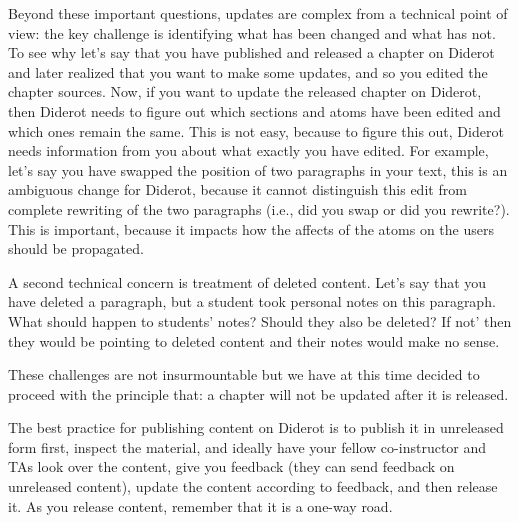 Beyond these important questions, updates are complex from a technical
point of view: the key challenge is identifying what has been changed
and what has not.
%
To see why let's say that you have published and released a chapter on Diderot and later realized that you want to make some updates, and so you edited the chapter sources.
%
Now, if you want to update the released chapter on Diderot, then
Diderot needs to figure out which sections and atoms have been edited
and which ones remain the same.  This is not easy, because to figure
this out, Diderot needs information from you about what exactly you
have edited.  For example, let's say you have swapped the position of
two paragraphs in your text, this is an ambiguous change for Diderot,
because it cannot distinguish this edit from complete rewriting of the
two paragraphs (i.e., did you swap or did you rewrite?). 
%
This is important, because it impacts how the affects of the atoms on the users should be propagated.  

%
A second technical concern is treatment of deleted content.  Let's say that you have deleted a paragraph, but a student took personal notes on this paragraph.  What should happen to students' notes?  Should they also be deleted? If not' then they would be pointing to deleted content and their notes would make no sense.  

\begin{gram}
These challenges are not insurmountable but we have at this time decided to proceed with the principle that: a chapter will not be updated after it is released.
\end{gram}


\begin{gram}
The best practice for publishing content on Diderot is to publish it in unreleased form first, inspect the material, and ideally have your fellow co-instructor and TAs look over the content, give you feedback (they can send feedback on unreleased content), update the content according to feedback, and then release it. 
%
As you release content, remember that it is a one-way road.
\end{gram}

